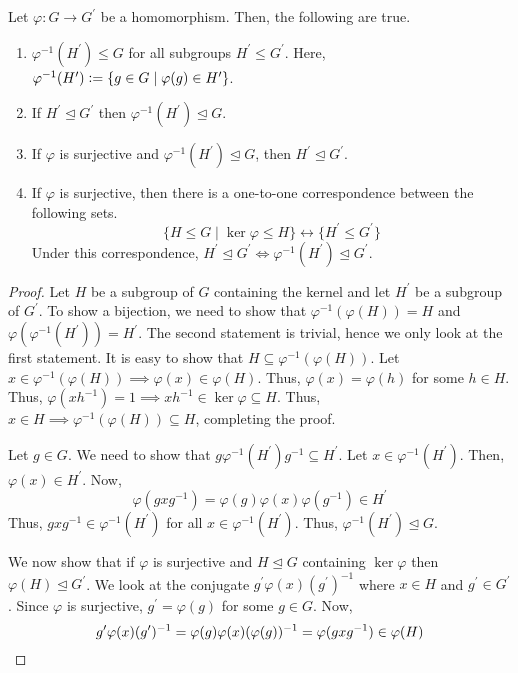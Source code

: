 \begin{theorem} \label{thm:correspondence}
    Let $\varphi \colon G \to G^{\prime}$ be a homomorphism. Then, the following are true.
    \begin{enumerate}
        \item $\varphi^{-1}(H^{\prime}) \leq G$ for all subgroups $H^{\prime} \leq G^{\prime}$. Here, $\varphi^{-1}(H^{\prime}) \vcentcolon= \{ g \in G \mid \varphi(g) \in H^{\prime} \}$.
        \item If $H^{\prime} \trianglelefteq G^{\prime}$ then $\varphi^{-1}(H^{\prime}) \trianglelefteq G$.
        \item If $\varphi$ is surjective and $\varphi^{-1}(H^{\prime}) \trianglelefteq G$, then $H^{\prime} \trianglelefteq G^{\prime}$.
        \item If $\varphi$ is surjective, then there is a one-to-one correspondence between the following sets.
        \[
            \{ H \leq G \mid \ker\varphi \leq H \} \longleftrightarrow \{ H^{\prime} \leq G^{\prime} \}
        \]
        Under this correspondence, $H^{\prime} \trianglelefteq G^{\prime} \iff \varphi^{-1}(H^{\prime}) \trianglelefteq G^{\prime}$.
    \end{enumerate}
\end{theorem}
\begin{proof}
    Let $H$ be a subgroup of $G$ containing the kernel and let $H^{\prime}$ be a subgroup of $G^{\prime}$. To show a bijection, we need to show that $\varphi^{-1}(\varphi(H)) = H$ and $\varphi(\varphi^{-1}(H^{\prime})) = H^{\prime}$. The second statement is trivial, hence we only look at the first statement. It is easy to show that $H \subseteq \varphi^{-1}(\varphi(H))$. Let $x \in \varphi^{-1}(\varphi(H)) \implies \varphi(x) \in \varphi(H)$. Thus, $\varphi(x) = \varphi(h)$ for some $h \in H$. Thus, $\varphi(xh^{-1}) = 1 \implies xh^{-1} \in \ker\varphi \subseteq H$. Thus, $x \in H \implies \varphi^{-1}(\varphi(H)) \subseteq H$, completing the proof.
    
    \medskip
    
    Let $g \in G$. We need to show that $g \varphi^{-1}(H^{\prime})g^{-1} \subseteq H^{\prime}$. Let $x \in \varphi^{-1}(H^{\prime})$. Then, $\varphi(x) \in H^{\prime}$. Now, 
    \[
        \varphi(gxg^{-1}) = \varphi(g) \varphi(x) \varphi(g^{-1}) \in H^{\prime}
    \]
    Thus, $gxg^{-1} \in \varphi^{-1}(H^{\prime})$ for all $x \in \varphi^{-1}(H^{\prime})$. Thus, $\varphi^{-1}(H^{\prime}) \trianglelefteq G$.
    
    \medskip
    
    We now show that if $\varphi$ is surjective and $H \trianglelefteq G$ containing $\ker\varphi$ then $\varphi(H) \trianglelefteq G^{\prime}$. We look at the conjugate $g^{\prime}\varphi(x)(g^{\prime})^{-1}$ where $x \in H$ and $g^{\prime} \in G^{\prime}$. Since $\varphi$ is surjective, $g^{\prime} = \varphi(g)$ for some $g \in G$. Now, 
    \[
        g^{\prime}\varphi(x)(g^{\prime})^{-1} = \varphi(g)\varphi(x)(\varphi(g))^{-1} = \varphi(gxg^{-1}) \in \varphi(H) \qedhere
    \]
\end{proof}

